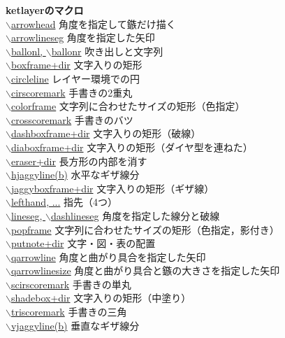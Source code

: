 \documentclass[a4j,12pt,dvipdfmx]{ujarticle}
\newcommand{\bs}{$\backslash$}
\begin{document}
\begin{tabbing}
{\bf ketlayerのマクロ} \> \\
\hyperlink{arrowhead}{\bs arrowhead} \> 角度を指定して鏃だけ描く\\
\hyperlink{arrowhead}{\bs arrowlineseg} \> 角度を指定した矢印\\
\hyperlink{ballon}{\bs ballonl, \bs ballonr} \> 吹き出しと文字列\\
\hyperlink{boxframe}{\bs boxframe+dir} \> 文字入りの矩形\\
\hyperlink{circleline}{\bs circleline} \> レイヤー環境での円\\
\hyperlink{cirscoremark}{\bs cirscoremark} \> 手書きの2重丸\\
\hyperlink{colorframe}{\bs colorframe} \> 文字列に合わせたサイズの矩形（色指定）\\
\hyperlink{crosscoremark}{\bs crosscoremark} \> 手書きのバツ\\
\hyperlink{dashboxframe}{\bs dashboxframe+dir} \> 文字入りの矩形（破線）\\
\hyperlink{diaboxframe}{\bs diaboxframe+dir} \> 文字入りの矩形（ダイヤ型を連ねた）\\
\hyperlink{eraser}{\bs eraser+dir} \> 長方形の内部を消す\\
\hyperlink{hjaggyline}{\bs hjaggyline(b)} \> 水平なギザ線分\\
\hyperlink{jaggyboxframe}{\bs jaggyboxframe+dir} \> 文字入りの矩形（ギザ線）\\
\hyperlink{lefthand}{\bs lefthand, ...} \> 指先（4つ）\\
\hyperlink{lineseg}{\bs lineseg, \bs dashlineseg} \> 角度を指定した線分と破線\\
\hyperlink{popframe}{\bs popframe} \> 文字列に合わせたサイズの矩形（色指定，影付き）\\
\hyperlink{putnote}{\bs putnote+dir} \> 文字・図・表の配置\\
\hyperlink{qarrowline}{\bs qarrowline} \> 角度と曲がり具合を指定した矢印\\
\hyperlink{qarrowline}{\bs qarrowlinesize} \> 角度と曲がり具合と鏃の大きさを指定した矢印\\
\hyperlink{scirscoremark}{\bs scirscoremark} \> 手書きの単丸\\
\hyperlink{shadebox}{\bs shadebox+dir} \> 文字入りの矩形（中塗り）\\
\hyperlink{triscoremark}{\bs triscoremark} \> 手書きの三角\\
\hyperlink{vjaggyline}{\bs vjaggyline(b)} \> 垂直なギザ線分\\

\end{tabbing}
\end{document}

